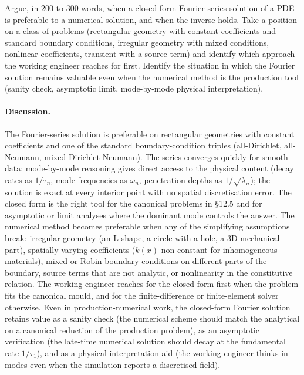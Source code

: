 \begin{exercise}
Argue, in 200 to 300 words, when a closed-form Fourier-series
solution of a PDE is preferable to a numerical solution, and when
the inverse holds. Take a position on a class of problems
(rectangular geometry with constant coefficients and standard
boundary conditions, irregular geometry with mixed conditions,
nonlinear coefficients, transient with a source term) and identify
which approach the working engineer reaches for first. Identify
the situation in which the Fourier solution remains valuable
even when the numerical method is the production tool (sanity
check, asymptotic limit, mode-by-mode physical interpretation).

\paragraph{Discussion.}
The Fourier-series solution is preferable on rectangular
geometries with constant coefficients and one of the standard
boundary-condition triples (all-Dirichlet, all-Neumann, mixed
Dirichlet-Neumann). The series converges quickly for smooth
data; mode-by-mode reasoning gives direct access to the
physical content (decay rates as $1/\tau_{n}$, mode frequencies
as $\omega_{n}$, penetration depths as $1/\sqrt{\lambda_{n}}$);
the solution is exact at every interior point with no spatial
discretisation error. The closed form is the right tool for the
canonical problems in §12.5 and for asymptotic or limit analyses
where the dominant mode controls the answer. The numerical method
becomes preferable when any of the simplifying assumptions break:
irregular geometry (an L-shape, a circle with a hole, a 3D
mechanical part), spatially varying coefficients ($k(x)$
non-constant for inhomogeneous materials), mixed or Robin
boundary conditions on different parts of the boundary, source
terms that are not analytic, or nonlinearity in the constitutive
relation. The working engineer reaches for the closed form first
when the problem fits the canonical mould, and for the
finite-difference or finite-element solver otherwise. Even in
production-numerical work, the closed-form Fourier solution
retains value as a sanity check (the numerical scheme should
match the analytical on a canonical reduction of the production
problem), as an asymptotic verification (the late-time numerical
solution should decay at the fundamental rate $1/\tau_{1}$), and
as a physical-interpretation aid (the working engineer thinks in
modes even when the simulation reports a discretised field).
\end{exercise}
